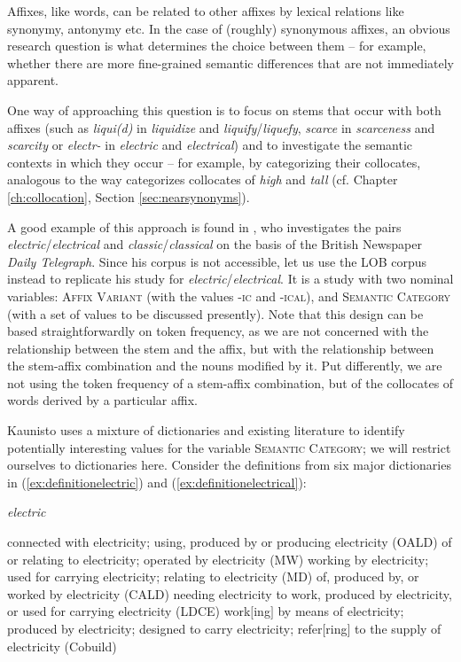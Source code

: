 Affixes, like words, can be related to other affixes by lexical relations like synonymy, antonymy etc. In the case of (roughly) synonymous affixes, an obvious research question is what determines the choice between them -- for example, whether there are more fine-grained semantic differences that are not immediately apparent.

One way of approaching this question is to focus on stems that occur with both affixes (such as \textit{liqui(d)} in \textit{liquidize} and \textit{liquify}/\textit{liquefy}, \textit{scarce} in \textit{scarceness} and \textit{scarcity} or \textit{electr-} in \textit{electric} and \textit{electrical}) and to investigate the semantic contexts in which they occur -- for example, by categorizing their collocates, analogous to the way \citet{taylor_near_2003} categorizes collocates of \textit{high} and \textit{tall} (cf. Chapter \ref{ch:collocation}, Section \ref{sec:nearsynonyms}).

A good example of this approach is found in \citet{kaunisto_electric/electrical_1999}, who investigates the pairs \textit{electric}/\textit{electrical} and \textit{classic}/\textit{classical} on the basis of the British Newspaper \textit{Daily Telegraph}. Since his corpus is not accessible, let us use the LOB corpus instead to replicate his study for \textit{electric}/\textit{electrical}. It is a study with two nominal variables: \textsc{Affix Variant} (with the values \textsc{-ic} and \textsc{-ical}), and \textsc{Semantic Category} (with a set of values to be discussed presently). Note that this design can be based straightforwardly on token frequency, as we are not concerned with the relationship between the stem and the affix, but with the relationship between the stem-affix combination and the nouns modified by it. Put differently, we are not using the token frequency of a stem-affix combination, but of the collocates of words derived by a particular affix.

Kaunisto uses a mixture of dictionaries and existing literature to identify potentially interesting values for the variable \textsc{Semantic Category}; we will restrict ourselves to dictionaries here. Consider the definitions from six major dictionaries in (\ref{ex:definitionelectric}) and (\ref{ex:definitionelectrical}):

\begin{exe}
\ex \textit{electric}
\begin{xlist} 
\label{ex:definitionelectric}
\ex connected with electricity; using, produced by or producing electricity (OALD)
\ex of or relating to electricity; operated by electricity (MW)
\ex working by electricity; used for carrying electricity; relating to electricity (MD)
\ex of, produced by, or worked by electricity (CALD)
\ex needing electricity to work, produced by electricity, or used for carrying electricity (LDCE)
\ex work$[$ing$]$ by means of electricity; produced by electricity; designed to carry electricity; refer$[$ring$]$ to the supply of electricity (Cobuild)
\end{xlist}
\end{exe}

